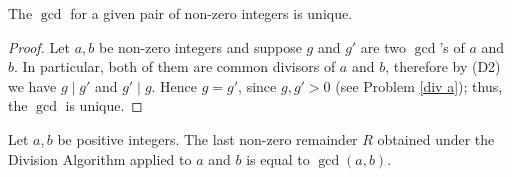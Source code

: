 \vspace*{1em}

\begin{lemma}
The $\gcd$ for a given pair of non-zero integers is unique.
\end{lemma}
\begin{proof}
Let $a,b$ be non-zero integers and suppose $g$ and $g'$ are two $\gcd$'s of $a$ and $b$. In particular, both of them are common divisors of $a$ and $b$, therefore by (D2) we have $g\mid g'$ and $g'\mid g$. Hence $g = g'$, since $g,g'>0$ (see Problem \ref{div a}); thus, the $\gcd$ is unique.
\end{proof}

\vspace*{1em}

\begin{theorem}\label{Theorem 1.6}
Let $a,b$ be positive integers. The last non-zero remainder $R$ obtained under the Division Algorithm applied to $a$ and $b$ is equal to $\gcd(a,b)$.
\end{theorem}
